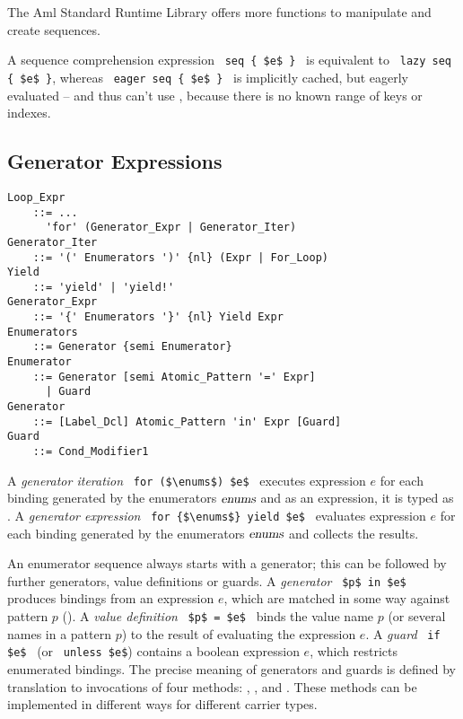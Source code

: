 The Aml Standard Runtime Library offers more functions to manipulate and create sequences. 

A sequence comprehension expression ~\lstinline!seq { $e$ }!~ is equivalent to ~\lstinline!lazy seq { $e$ }!, whereas ~\lstinline!eager seq { $e$ }!~ is implicitly cached, but eagerly evaluated -- and thus can't use , because there is no known range of keys or indexes.






\subsection{Generator Expressions}
\label{sec:generator-expressions}

\grammar\begin{lstlisting}
Loop_Expr
    ::= ...
      'for' (Generator_Expr | Generator_Iter)
Generator_Iter 
    ::= '(' Enumerators ')' {nl} (Expr | For_Loop)
Yield 
    ::= 'yield' | 'yield!'
Generator_Expr 
    ::= '{' Enumerators '}' {nl} Yield Expr
Enumerators
    ::= Generator {semi Enumerator}
Enumerator
    ::= Generator [semi Atomic_Pattern '=' Expr]
      | Guard
Generator 
    ::= [Label_Dcl] Atomic_Pattern 'in' Expr [Guard]
Guard 
    ::= Cond_Modifier1
\end{lstlisting}

A {\em generator iteration} ~\lstinline!for ($\enums$) $e$!~ executes expression $e$ for each binding generated by the enumerators $\mbox{\sl enums}$ and as an expression, it is typed as . A {\em generator expression} ~\lstinline!for {$\enums$} yield $e$!~ evaluates expression $e$ for each binding generated by the enumerators $\mbox{\sl enums}$ and collects the results.

An enumerator sequence always starts with a generator; this can be followed by further generators, value definitions or guards. A {\em generator} ~\lstinline!$p$ in $e$!~ produces bindings from an expression $e$, which are matched in some way against pattern $p$ (). A {\em value definition} ~\lstinline!$p$ = $e$!~ binds the value name $p$ (or several names in a pattern $p$) to the result of evaluating the expression $e$. A {\em guard} ~\lstinline!if $e$!~ (or ~\lstinline!unless $e$!) contains a boolean expression $e$, which restricts enumerated bindings. The precise meaning of generators and guards is defined by translation to invocations of four methods: , ,  and . These methods can be implemented in different ways for different carrier types.

